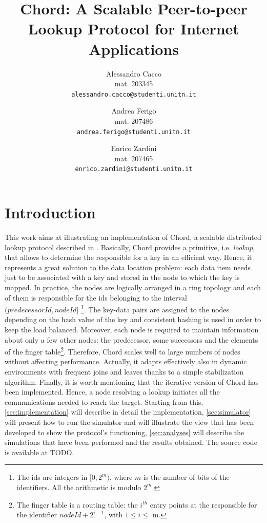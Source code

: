 \documentclass[11pt,twocolumn,letterpaper]{article}
\begin{document}
	
	\title{Chord: A Scalable Peer-to-peer Lookup Protocol for Internet Applications}
	
	\author{Alessandro Cacco\\
		mat. 203345\\
		{\tt\small alessandro.cacco@studenti.unitn.it}
		\and
		Andrea Ferigo\\
		mat. 207486\\
		{\tt\small andrea.ferigo@studenti.unitn.it}
		\and
		Enrico Zardini\\
		mat. 207465\\
		{\tt\small enrico.zardini@studenti.unitn.it}
	}
	\date{}
	\maketitle
	
	\section{Introduction}
	\label{sec:intro}
	This work aims at illustrating an implementation of Chord, a scalable distributed lookup protocol described in \cite{chord}. Basically, Chord provides a primitive, i.e. \textit{lookup}, that allows to determine the responsible for a key in an efficient way. Hence, it represents a great solution to the data location problem: each data item needs just to be associated with a key and stored in the node to which the key is mapped. \newline 
	In practice, the nodes are logically arranged in a ring topology and each of them is responsible for the ids belonging to the interval $(predecessorId, nodeId]$ \footnote{The ids are integers in $[0,2^m)$, where $m$ is the number of bits of the identifiers. All the arithmetic is modulo $2^m$.}. The key-data pairs are assigned to the nodes depending on the hash value of the key and consistent hashing is used in order to keep the load balanced. Moreover, each node is required to maintain information about only a few other nodes: the predecessor, some successors and the elements of the finger table\footnote{The finger table is a routing table: the $i^{th}$ entry points at the responsible for the identifier $nodeId+2^{i-1}$, with $1\leq i \leq$ m.\label{foot:ftable}}. Therefore, Chord scales well to large numbers of nodes without affecting performance. Actually, it adapts effectively also in dynamic environments with frequent joins and leaves thanks to a simple stabilization algorithm. \newline
	Finally, it is worth mentioning that the iterative version of Chord has been implemented. Hence, a node resolving a lookup initiates all the communications needed to reach the target. \newline
	Starting from this, \cref{sec:implementation} will describe in detail the implementation, \cref{sec:simulator} will present how to run the simulator and will illustrate the view that has been developed to show the protocol's functioning, \cref{sec:analyses} will describe the simulations that have been performed and the results obtained. \newline
	The source code is available at TODO. 
	
\end{document}
